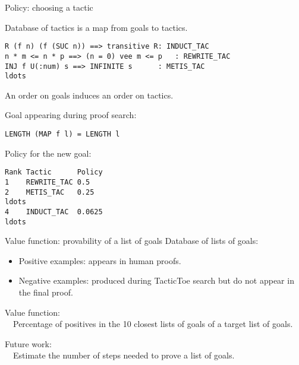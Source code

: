 \documentclass{beamer}
\def\tactictoe{\textsf{TacticToe}\xspace}
\begin{document}
\begin{frame}[fragile]{Policy: choosing a tactic}

Database of tactics is a map from goals to tactics.
\begin{lstlisting}[language=SMLSmall]
R (f n) (f (SUC n)) ==> transitive R: INDUCT_TAC
n * m <= n * p ==> (n = 0) vee m <= p   : REWRITE_TAC
INJ f U(:num) s ==> INFINITE s      : METIS_TAC
ldots
\end{lstlisting}
An order on goals induces an order on tactics.


Goal appearing during proof search:
\begin{lstlisting}[language=SMLSmall]
LENGTH (MAP f l) = LENGTH l
\end{lstlisting}

Policy for the new goal:
\begin{lstlisting}[language=SMLSmall]
Rank Tactic      Policy
1    REWRITE_TAC 0.5 
2    METIS_TAC   0.25
ldots 
4    INDUCT_TAC  0.0625
ldots
\end{lstlisting}
\end{frame}

\begin{frame}{Value function: provability of a list of goals}
Database of lists of goals:\\
\begin{itemize}
\item Positive examples: appears in human proofs.
\item Negative examples: produced during \tactictoe search but do not appear in 
the final proof.
\end{itemize}

Value function:\\
\ \ Percentage of positives in the 10 closest lists of goals of a target list 
of goals. 

\vspace{5mm}

Future work:\\
\ \ Estimate the number of steps needed to prove a list of goals.

\end{frame}
\end{document}
